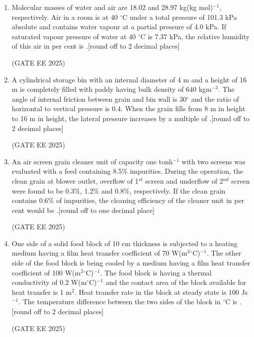 \documentclass[journal,12pt,onecolumn]{IEEEtran}
\theoremstyle{remark}
\begin{document}
\begin{enumerate}
\item Molecular masses of water and air are 18.02 and 28.97 kg(kg mol)$^{-1}$, respectively. Air in a room is at 40 $^\circ$C under a total pressure of 101.3 kPa absolute and contains water vapour at a partial pressure of 4.0 kPa. If saturated vapour pressure of water at 40 $^\circ$C is 7.37 kPa, the relative humidity of this air in per cent is \underline{\hspace{2cm}}.{[round off to 2 decimal places]}

\hfill(GATE EE 2025)

\item A cylindrical storage bin with an internal diameter of 4 m and a height of 16 m is completely filled with paddy having bulk density of 640 kgm$^{-3}$. The angle of internal friction between grain and bin wall is 30$^\circ$ and the ratio of horizontal to vertical pressure is 0.4. When the grain fills from 8 m in height to 16 m in height, the lateral pressure increases by a multiple of \underline{\hspace{2cm}}.{[round off to 2 decimal places]}

\hfill(GATE EE 2025)

\item An air screen grain cleaner unit of capacity one tonh$^{-1}$ with two screens was evaluated with a feed containing 8.5\% impurities. During the operation, the clean grain at blower outlet, overflow of 1$^{st}$ screen and underflow of 2$^{nd}$ screen were found to be 0.3\%, 1.2\% and 0.8\%, respectively. If the clean grain contains 0.6\% of impurities, the cleaning efficiency of the cleaner unit in per cent would be \underline{\hspace{2cm}}.{[round off to one decimal place]}

\hfill(GATE EE 2025)

\item One side of a solid food block of 10 cm thickness is subjected to a heating medium having a film heat transfer coefficient of 70 W(m$^2$$^\circ$C)$^{-1}$. The other side of the food block is being cooled by a medium having a film heat transfer coefficient of 100 W(m$^2$$^\circ$C)$^{-1}$. The food block is having a thermal conductivity of 0.2 W(m$^\circ$C)$^{-1}$ and the contact area of the block available for heat transfer is 1 m$^2$. Heat transfer rate in the block at steady state is 100 Js$^{-1}$. The temperature difference between the two sides of the block in $^\circ$C is \underline{\hspace{2cm}}.{[round off to 2 decimal places]}

\hfill(GATE EE 2025)

\end{enumerate}
\end{document}
